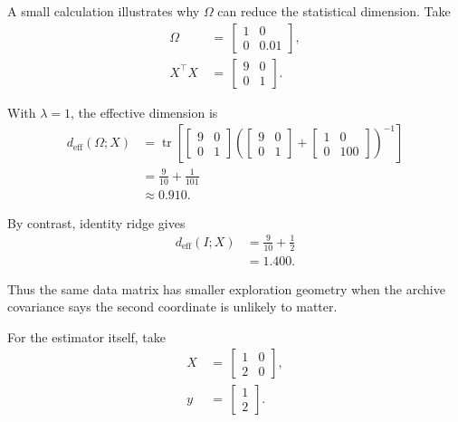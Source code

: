 \documentclass{article} %
\begin{document}
A small calculation illustrates why \(\Omega\) can reduce the statistical
dimension. Take
\begin{align}
\Omega
&\,=\,
\begin{bmatrix}
1&0\\
0&0.01
\end{bmatrix},
\label{eq:hyper-example-omega}
\\
X^\top X
&\,=\,
\begin{bmatrix}
9&0\\
0&1
\end{bmatrix}.
\label{eq:hyper-example-xtx}
\end{align}

With \(\lambda=1\), the effective dimension is
\begin{equation}
\label{eq:hyper-example-deff-app}
\begin{aligned}
d_{\mathrm{eff}}(\Omega;X)
&=
\operatorname{tr}
\left[
\begin{bmatrix}
9&0\\
0&1
\end{bmatrix}
\left(
\begin{bmatrix}
9&0\\
0&1
\end{bmatrix}
+
\begin{bmatrix}
1&0\\
0&100
\end{bmatrix}
\right)^{-1}
\right]
\\
&=
\frac{9}{10}+\frac{1}{101}
\\
&\approx
0.910 .
\end{aligned}
\end{equation}

By contrast, identity ridge gives
\begin{equation}
\label{eq:hyper-example-identity}
\begin{aligned}
d_{\mathrm{eff}}(I;X)
&=
\frac{9}{10}+\frac{1}{2}
\\
&=
1.400 .
\end{aligned}
\end{equation}

Thus the same data matrix has smaller exploration geometry when the archive covariance says the second coordinate is unlikely to matter.

For the estimator itself, take
\begin{align}
X
&\,=\,
\begin{bmatrix}
1&0\\
2&0
\end{bmatrix},
\label{eq:hyper-example-X}
\\
y
&\,=\,
\begin{bmatrix}
1\\
2
\end{bmatrix}.
\label{eq:hyper-example-y}
\end{align}
\end{document}
